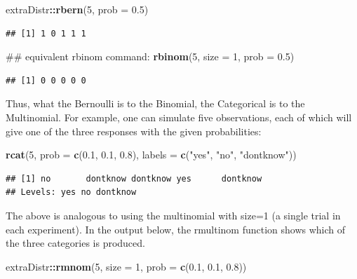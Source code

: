 \documentclass[12pt,]{krantz}
\newenvironment{Shaded}{\begin{snugshade}}{\end{snugshade}}
\newcommand{\KeywordTok}[1]{\textcolor[rgb]{0.13,0.29,0.53}{\textbf{#1}}}
\newcommand{\DataTypeTok}[1]{\textcolor[rgb]{0.13,0.29,0.53}{#1}}
\newcommand{\DecValTok}[1]{\textcolor[rgb]{0.00,0.00,0.81}{#1}}
\newcommand{\FloatTok}[1]{\textcolor[rgb]{0.00,0.00,0.81}{#1}}
\newcommand{\StringTok}[1]{\textcolor[rgb]{0.31,0.60,0.02}{#1}}
\newcommand{\OperatorTok}[1]{\textcolor[rgb]{0.81,0.36,0.00}{\textbf{#1}}}
\newcommand{\NormalTok}[1]{#1}
\theoremstyle{definition}
\theoremstyle{definition}
\theoremstyle{definition}
\theoremstyle{remark}
\begin{document}
\begin{Shaded}
\begin{Highlighting}[]
\NormalTok{extraDistr}\OperatorTok{::}\KeywordTok{rbern}\NormalTok{(}\DecValTok{5}\NormalTok{, }\DataTypeTok{prob =} \FloatTok{0.5}\NormalTok{)}
\end{Highlighting}
\end{Shaded}

\begin{verbatim}
## [1] 1 0 1 1 1
\end{verbatim}

\begin{Shaded}
\begin{Highlighting}[]
\NormalTok{## equivalent rbinom command:}
\KeywordTok{rbinom}\NormalTok{(}\DecValTok{5}\NormalTok{, }\DataTypeTok{size =} \DecValTok{1}\NormalTok{, }\DataTypeTok{prob =} \FloatTok{0.5}\NormalTok{)}
\end{Highlighting}
\end{Shaded}

\begin{verbatim}
## [1] 0 0 0 0 0
\end{verbatim}

Thus, what the Bernoulli is to the Binomial, the Categorical is to the
Multinomial. For example, one can simulate five observations, each of
which will give one of the three responses with the given probabilities:

\begin{Shaded}
\begin{Highlighting}[]
\KeywordTok{rcat}\NormalTok{(}\DecValTok{5}\NormalTok{, }\DataTypeTok{prob =} \KeywordTok{c}\NormalTok{(}\FloatTok{0.1}\NormalTok{, }\FloatTok{0.1}\NormalTok{, }\FloatTok{0.8}\NormalTok{), }\DataTypeTok{labels =} \KeywordTok{c}\NormalTok{(}\StringTok{"yes"}\NormalTok{, }\StringTok{"no"}\NormalTok{, }\StringTok{"dontknow"}\NormalTok{))}
\end{Highlighting}
\end{Shaded}

\begin{verbatim}
## [1] no       dontknow dontknow yes      dontknow
## Levels: yes no dontknow
\end{verbatim}

The above is analogous to using the multinomial with size=1 (a single
trial in each experiment). In the output below, the rmultinom function
shows which of the three categories is produced.

\begin{Shaded}
\begin{Highlighting}[]
\NormalTok{extraDistr}\OperatorTok{::}\KeywordTok{rmnom}\NormalTok{(}\DecValTok{5}\NormalTok{, }\DataTypeTok{size =} \DecValTok{1}\NormalTok{, }\DataTypeTok{prob =} \KeywordTok{c}\NormalTok{(}\FloatTok{0.1}\NormalTok{, }\FloatTok{0.1}\NormalTok{, }\FloatTok{0.8}\NormalTok{))}
\end{Highlighting}
\end{Shaded}
\end{document}
